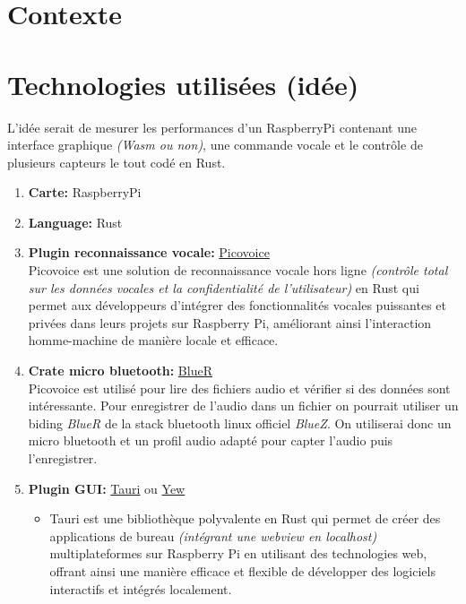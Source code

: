 \section{Contexte}




\section{Technologies utilisées (idée)}

L'idée serait de mesurer les performances d'un RaspberryPi contenant une interface graphique \textit{(Wasm ou non)}, une commande vocale et le contrôle de plusieurs capteurs le tout codé en Rust.
\vspace{.3cm}

\begin{enumerate}
    \item \textbf{Carte:} RaspberryPi 
    \item \textbf{Language:} Rust 
    \item \textbf{Plugin reconnaissance vocale:} \href{https://picovoice.ai/}{Picovoice} \\
            Picovoice est une solution de reconnaissance vocale hors ligne \textit{(contrôle total sur les données vocales et la confidentialité de l'utilisateur)} en Rust qui permet aux développeurs d'intégrer 
            des fonctionnalités vocales puissantes et privées dans leurs projets sur Raspberry Pi, améliorant ainsi l'interaction homme-machine de manière locale et efficace. 

    \item \textbf{Crate micro bluetooth:} \href{https://crates.io/crates/bluer}{BlueR} \\
            Picovoice est utilisé pour lire des fichiers audio et vérifier si des données sont intéressante. Pour enregistrer de l'audio dans un fichier
            on pourrait utiliser un biding \textit{BlueR} de la stack bluetooth linux officiel \textit{BlueZ}. On utiliserai donc un micro bluetooth et un profil
            audio adapté pour capter l'audio puis l'enregistrer.

    \item \textbf{Plugin GUI:} \href{https://tauri.app/}{Tauri} ou \href{https://yew.rs/}{Yew}

        \begin{itemize}
            \item Tauri est une bibliothèque polyvalente en Rust qui permet de créer des applications de bureau \textit{(intégrant une webview en localhost)}
            multiplateformes sur Raspberry Pi en utilisant des technologies web, offrant ainsi une manière efficace et flexible de développer des logiciels interactifs et intégrés localement.


\end{itemize}
\end{enumerate}
